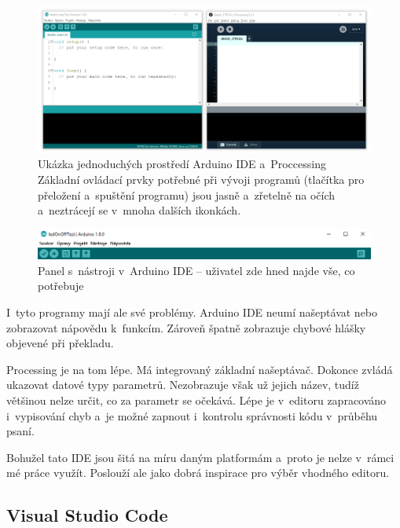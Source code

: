 \begin{figure}[h]
    \centering
    \includegraphics[width=\textwidth]{images/arduino+processing.png}
    \caption[Ukázka jednoduchých prostředí Arduino IDE a~Proccessing]{Ukázka jednoduchých prostředí Arduino IDE a~Proccessing \\
    Základní ovládací prvky potřebné při vývoji programů (tlačítka pro přeložení a~spuštění programu) jsou jasně a~zřetelně na očích a~neztrácejí se v~mnoha dalších ikonkách.}
    \label{fig:arduino+processing}
\end{figure}

\begin{figure}[h]
    \centering
    \includegraphics[width=\textwidth]{images/arduino-ide_tools-panel.png}
    \caption{Panel s~nástroji v~Arduino IDE -- uživatel zde hned najde vše, co potřebuje}
    \label{fig:arduino-ide_tools-panel}
\end{figure}

I~tyto programy mají ale své problémy. 
Arduino IDE neumí našeptávat nebo zobrazovat nápovědu k~funkcím. 
Zároveň špatně zobrazuje chybové hlášky objevené při překladu.

Processing je na tom lépe. 
Má integrovaný základní našeptávač. 
Dokonce zvládá ukazovat datové typy parametrů.
Nezobrazuje však už jejich název, tudíž většinou nelze určit, co za parametr se očekává.
Lépe je v~editoru zapracováno i~vypisování chyb a~je možné zapnout i~kontrolu správnosti kódu v~průběhu psaní.

Bohužel tato IDE jsou šitá na míru daným platformám a~proto je nelze v~rámci mé práce využít. 
Poslouží ale jako dobrá inspirace pro výběr vhodného editoru.

\subsection{Visual Studio Code}


